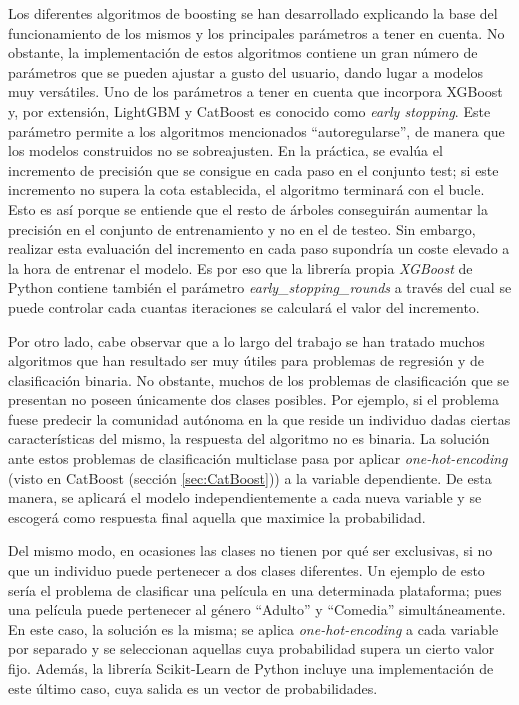 \documentclass[12pt,twoside]{article}
\begin{document}
Los diferentes algoritmos de boosting se han desarrollado explicando la base del funcionamiento de los mismos y los principales parámetros a tener en cuenta. No obstante, la implementación de estos algoritmos contiene un gran número de parámetros que se pueden ajustar a gusto del usuario, dando lugar a modelos muy versátiles. Uno de los parámetros a tener en cuenta que incorpora XGBoost y, por extensión, LightGBM y CatBoost es conocido como \textit{early stopping}. Este parámetro permite a los algoritmos mencionados ``autoregularse'', de manera que los modelos construidos no se sobreajusten. En la práctica, se evalúa el incremento de precisión que se consigue en cada paso en el conjunto test; si este incremento no supera la cota establecida, el algoritmo terminará con el bucle. Esto es así porque se entiende que el resto de árboles conseguirán aumentar la precisión en el conjunto de entrenamiento y no en el de testeo. Sin embargo, realizar esta evaluación del incremento en cada paso supondría un coste elevado a la hora de entrenar el modelo. Es por eso que la librería propia \textit{XGBoost} de Python contiene también el parámetro \textit{early\_stopping\_rounds} a través del cual se puede controlar cada cuantas iteraciones se calculará el valor del incremento.

Por otro lado, cabe observar que a lo largo del trabajo se han tratado muchos algoritmos que han resultado ser muy útiles para problemas de regresión y de clasificación binaria. No obstante, muchos de los problemas de clasificación que se presentan no poseen únicamente dos clases posibles. Por ejemplo, si el problema fuese predecir la comunidad autónoma en la que reside un individuo dadas ciertas características del mismo, la respuesta del algoritmo no es binaria. La solución ante estos problemas de clasificación multiclase pasa por aplicar \textit{one-hot-encoding} (visto en CatBoost (sección \ref{sec:CatBoost})) a la variable dependiente. De esta manera, se aplicará el modelo independientemente a cada nueva variable y se escogerá como respuesta final aquella que maximice la probabilidad.

Del mismo modo, en ocasiones las clases no tienen por qué ser exclusivas, si no que un individuo puede pertenecer a dos clases diferentes. Un ejemplo de esto sería el problema de clasificar una película en una determinada plataforma; pues una película puede pertenecer al género ``Adulto'' y ``Comedia'' simultáneamente. En este caso, la solución es la misma; se aplica \textit{one-hot-encoding} a cada variable por separado y se seleccionan aquellas cuya probabilidad supera un cierto valor fijo. Además, la librería Scikit-Learn de Python incluye una implementación de este último caso, cuya salida es un vector de probabilidades. 
\end{document}
